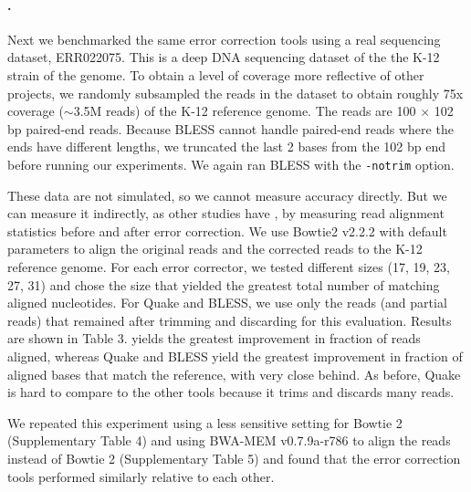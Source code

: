 \documentclass{bmcart}
\begin{document}
\paragraph{\ecolinoemph.}  Next we benchmarked the same error correction tools using a real sequencing dataset, ERR022075.
This is a deep DNA sequencing dataset of the the K-12 strain of the \ecoli genome.
To obtain a level of coverage more reflective of other projects, we randomly subsampled the reads in the dataset to obtain roughly 75x coverage ($\sim$3.5M reads) of the \ecoli K-12 reference genome.
The reads are 100 $\times$ 102 bp paired-end reads.
Because BLESS cannot handle paired-end reads where the ends have different lengths, we truncated the last 2 bases from the 102 bp end before running our experiments.
We again ran BLESS with the \verb+-notrim+ option.

 
These data are not simulated, so we cannot measure accuracy directly.  But we can measure it indirectly, as other studies have \cite{heo2014bless}, by measuring read alignment statistics before and after error correction.  We use Bowtie2 \cite{langmead2012fast} v2.2.2 with default parameters to align the original reads and the corrected reads to the \ecoli K-12 reference genome.
For each error corrector, we tested different \kmer sizes (17, 19, 23, 27, 31) and chose the size that yielded the greatest total number of matching aligned nucleotides.
For Quake and BLESS, we use only the reads (and partial reads) that remained after trimming and discarding for this evaluation.
Results are shown in Table 3.
\tool yields the greatest improvement in fraction of reads aligned, whereas Quake and BLESS yield the greatest improvement in fraction of aligned bases that match the reference, with \tool very close behind.
As before, Quake is hard to compare to the other tools because it trims and discards many reads.

We repeated this experiment using a less sensitive setting for Bowtie 2 (Supplementary Table 4) and using BWA-MEM \cite{li2013aligning} v0.7.9a-r786 to align the reads instead of Bowtie 2 (Supplementary Table 5) and found that the error correction tools performed similarly relative to each other.

\end{document}
